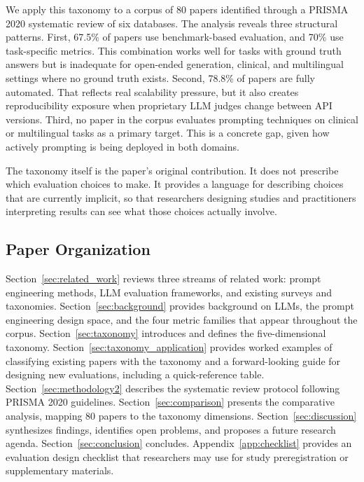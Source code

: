 \documentclass[journal]{IEEEtran}
\begin{document}
We apply this taxonomy to a corpus of 80 papers identified through
a PRISMA 2020 systematic review of six databases. The analysis
reveals three structural patterns. First, 67.5\% of papers use
benchmark-based evaluation, and 70\% use task-specific metrics.
This combination works well for tasks with ground truth answers but is
inadequate for open-ended generation, clinical, and multilingual
settings where no ground truth exists. Second, 78.8\% of papers are fully automated. That reflects real scalability pressure, but it also creates reproducibility exposure when proprietary LLM judges change between API versions. Third, no paper in the corpus
evaluates prompting techniques on clinical or multilingual tasks
as a primary target. This is a concrete gap, given how actively prompting is being deployed in both domains.

The taxonomy itself is the paper's original contribution. It does
not prescribe which evaluation choices to make. It provides a
language for describing choices that are currently implicit,
so that researchers designing studies and practitioners interpreting results can see what those choices actually involve.

\subsection*{Paper Organization}

Section~\ref{sec:related_work} reviews three streams of related
work: prompt engineering methods, LLM evaluation frameworks, and
existing surveys and taxonomies. Section~\ref{sec:background}
provides background on LLMs, the prompt engineering design space,
and the four metric families that appear throughout the corpus.
Section~\ref{sec:taxonomy} introduces and defines the
five-dimensional taxonomy. Section~\ref{sec:taxonomy_application}
provides worked examples of classifying existing papers with the
taxonomy and a forward-looking guide for designing new evaluations,
including a quick-reference table. Section~\ref{sec:methodology2}
describes the systematic review protocol following PRISMA 2020
guidelines. Section~\ref{sec:comparison} presents the comparative
analysis, mapping 80 papers to the taxonomy dimensions.
Section~\ref{sec:discussion} synthesizes findings, identifies
open problems, and proposes a future research agenda.
Section~\ref{sec:conclusion} concludes.
Appendix~\ref{app:checklist} provides an evaluation design checklist
that researchers may use for study preregistration or supplementary
materials.
\end{document}
